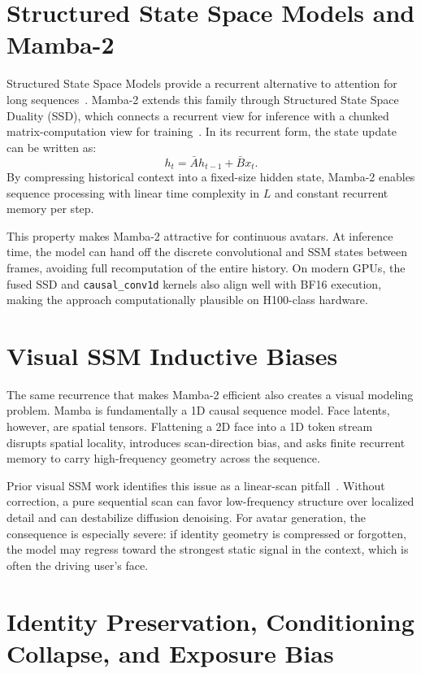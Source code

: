 \documentclass[12pt,letterpaper]{report}
\begin{document}
\section{Structured State Space Models and Mamba-2}

Structured State Space Models provide a recurrent alternative to attention for long sequences~\cite{gu2022efficiently}. Mamba-2 extends this family through Structured State Space Duality (SSD), which connects a recurrent view for inference with a chunked matrix-computation view for training~\cite{dao2024transformers}. In its recurrent form, the state update can be written as:
$$h_t = \bar{A}h_{t-1} + \bar{B}x_t.$$
By compressing historical context into a fixed-size hidden state, Mamba-2 enables sequence processing with linear time complexity in $L$ and constant recurrent memory per step.

This property makes Mamba-2 attractive for continuous avatars. At inference time, the model can hand off the discrete convolutional and SSM states between frames, avoiding full recomputation of the entire history. On modern GPUs, the fused SSD and \texttt{causal\_conv1d} kernels also align well with BF16 execution, making the approach computationally plausible on H100-class hardware.

\section{Visual SSM Inductive Biases}

The same recurrence that makes Mamba-2 efficient also creates a visual modeling problem. Mamba is fundamentally a 1D causal sequence model. Face latents, however, are spatial tensors. Flattening a 2D face into a 1D token stream disrupts spatial locality, introduces scan-direction bias, and asks finite recurrent memory to carry high-frequency geometry across the sequence.

Prior visual SSM work identifies this issue as a linear-scan pitfall~\cite{zhu2024vision, phung2024dimsum}. Without correction, a pure sequential scan can favor low-frequency structure over localized detail and can destabilize diffusion denoising. For avatar generation, the consequence is especially severe: if identity geometry is compressed or forgotten, the model may regress toward the strongest static signal in the context, which is often the driving user's face.

\section{Identity Preservation, Conditioning Collapse, and Exposure Bias}
\end{document}
